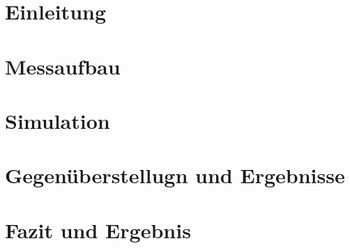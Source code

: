 \documentclass[parskip, twoside, accentcolor=tud9b, colorback, breaklinks, noresetcounter, noheadingspace, pdfencoding=unicode, 11pt, bigchapter, numbersubsubsec, numbers=noenddot, linedtoc, longdoc]{tudreport}
\begin{document}
\frontmatter
\hypersetup{pageanchor=false}
\maketitle
\hypersetup{pageanchor=true}
\cleardoublepage

%

\cleardoublepage
\pagestyle{plain}
\tableofcontents
\cleardoublepage


\pagestyle{headings}

\chapter{Einleitung}\label{chap:einleitung}
	
	
	
\chapter{Messaufbau}\label{chap:messaufbau}
	
	
\chapter{Simulation}\label{chap:simulation}
	\label{ch:sim}
	
	
	
\chapter{Gegen\"uberstellugn und Ergebnisse}\label{chap:ergebnis}
	
	
	
\chapter{Fazit und Ergebnis}\label{chap:fazit}
	
\end{document}

